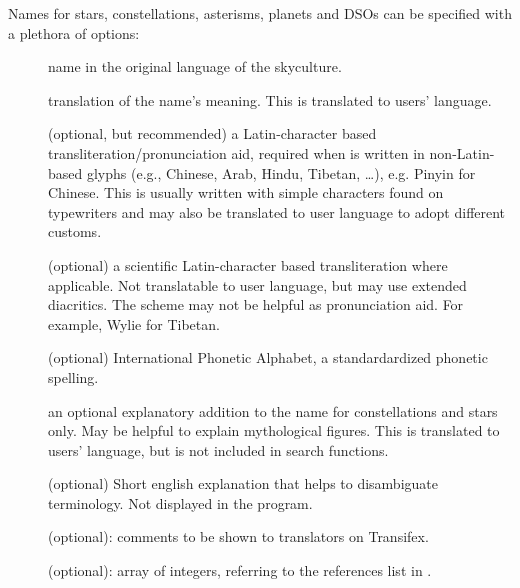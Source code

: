 Names for stars, constellations, asterisms, planets and DSOs can be specified with a plethora of options:
\begin{description}
    \item[] name in the original language of the skyculture. 
    \item[] translation of the name's meaning. This is translated to users' language.
    \item[] (optional, but recommended) a Latin-character based transliteration/pronunciation aid, 
    required when  is written in non-Latin-based glyphs (e.g., Chinese, Arab, Hindu, Tibetan, \ldots), 
    e.g. Pinyin for Chinese. This is usually written with simple characters found on typewriters and may also be translated to user language to adopt different customs.
    \item[] (optional) a scientific Latin-character based transliteration where applicable. Not translatable to user language, but may use extended diacritics.
	The scheme may not be helpful as pronunciation aid. For example, Wylie for Tibetan.
    \item[] (optional) International Phonetic Alphabet, a standardardized phonetic spelling.
    \item[] an optional explanatory addition to the name for constellations and stars only.  May be helpful to explain mythological figures. 
	This is translated to users' language, but is not included in search functions.
    \item[] (optional) Short english explanation that helps to disambiguate terminology. Not displayed in the program.
    \item[] (optional):  comments to be shown to translators on Transifex.
    \item[] (optional): array of integers, referring to the references list in . 
\end{description}


